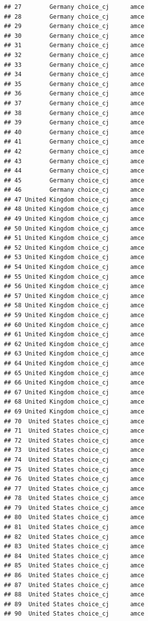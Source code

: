 \documentclass[a4paper,12pt]{article}\usepackage[]{graphicx}\usepackage[]{color}
\makeatletter
\newenvironment{kframe}{%
 \def\at@end@of@kframe{}%
 \ifinner\ifhmode%
  \def\at@end@of@kframe{\end{minipage}}%
  \begin{minipage}{\columnwidth}%
 \fi\fi%
 \def\FrameCommand##1{\hskip\@totalleftmargin \hskip-\fboxsep
 \colorbox{shadecolor}{##1}\hskip-\fboxsep
     \hskip-\linewidth \hskip-\@totalleftmargin \hskip\columnwidth}%
 \MakeFramed {\advance\hsize-\width
   \@totalleftmargin\z@ \linewidth\hsize
   \@setminipage}}%
 {\par\unskip\endMakeFramed%
 \at@end@of@kframe}
\newenvironment{knitrout}{}{} %
\makeatother
\begin{document}
\begin{knitrout}
\begin{kframe}
\begin{verbatim}
## 27        Germany choice_cj      amce
## 28        Germany choice_cj      amce
## 29        Germany choice_cj      amce
## 30        Germany choice_cj      amce
## 31        Germany choice_cj      amce
## 32        Germany choice_cj      amce
## 33        Germany choice_cj      amce
## 34        Germany choice_cj      amce
## 35        Germany choice_cj      amce
## 36        Germany choice_cj      amce
## 37        Germany choice_cj      amce
## 38        Germany choice_cj      amce
## 39        Germany choice_cj      amce
## 40        Germany choice_cj      amce
## 41        Germany choice_cj      amce
## 42        Germany choice_cj      amce
## 43        Germany choice_cj      amce
## 44        Germany choice_cj      amce
## 45        Germany choice_cj      amce
## 46        Germany choice_cj      amce
## 47 United Kingdom choice_cj      amce
## 48 United Kingdom choice_cj      amce
## 49 United Kingdom choice_cj      amce
## 50 United Kingdom choice_cj      amce
## 51 United Kingdom choice_cj      amce
## 52 United Kingdom choice_cj      amce
## 53 United Kingdom choice_cj      amce
## 54 United Kingdom choice_cj      amce
## 55 United Kingdom choice_cj      amce
## 56 United Kingdom choice_cj      amce
## 57 United Kingdom choice_cj      amce
## 58 United Kingdom choice_cj      amce
## 59 United Kingdom choice_cj      amce
## 60 United Kingdom choice_cj      amce
## 61 United Kingdom choice_cj      amce
## 62 United Kingdom choice_cj      amce
## 63 United Kingdom choice_cj      amce
## 64 United Kingdom choice_cj      amce
## 65 United Kingdom choice_cj      amce
## 66 United Kingdom choice_cj      amce
## 67 United Kingdom choice_cj      amce
## 68 United Kingdom choice_cj      amce
## 69 United Kingdom choice_cj      amce
## 70  United States choice_cj      amce
## 71  United States choice_cj      amce
## 72  United States choice_cj      amce
## 73  United States choice_cj      amce
## 74  United States choice_cj      amce
## 75  United States choice_cj      amce
## 76  United States choice_cj      amce
## 77  United States choice_cj      amce
## 78  United States choice_cj      amce
## 79  United States choice_cj      amce
## 80  United States choice_cj      amce
## 81  United States choice_cj      amce
## 82  United States choice_cj      amce
## 83  United States choice_cj      amce
## 84  United States choice_cj      amce
## 85  United States choice_cj      amce
## 86  United States choice_cj      amce
## 87  United States choice_cj      amce
## 88  United States choice_cj      amce
## 89  United States choice_cj      amce
## 90  United States choice_cj      amce

\end{verbatim}
\end{kframe}
\end{knitrout}
\end{document}
